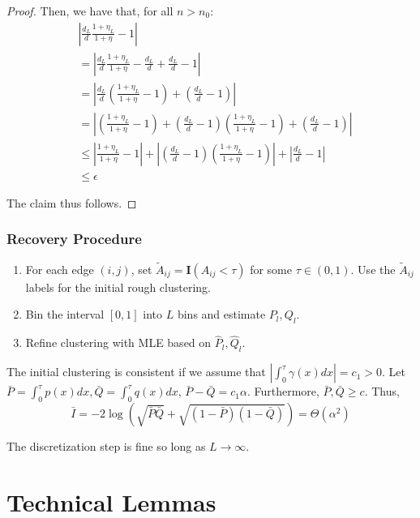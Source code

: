 \documentclass{article}
\begin{document}
\begin{proof}
Then, we have that, for all $n > n_0$:
\begin{align*}
& \left| \frac{d_L}{d} \frac{1+\eta_L}{1+\eta} - 1 \right | \\
&= \left| \frac{d_L}{d} \frac{1 + \eta_L}{1 + \eta} - \frac{d_L}{d} + \frac{d_L}{d} - 1 \right| \\
&= \left| \frac{d_L}{d} \left( \frac{1+\eta_L}{1+\eta} - 1 \right) + \left( \frac{d_L}{d} - 1 \right) \right| \\
&= \left| \left( \frac{1+\eta_L}{1 + \eta} - 1 \right) + \left( \frac{d_L}{d} -1 \right) \left( \frac{1+\eta_L}{1+\eta} - 1 \right) + \left( \frac{d_L}{d} - 1 \right) \right| \\
&\leq  \left| \frac{1+\eta_L}{1 + \eta} - 1 \right| + \left| \left( \frac{d_L}{d} -1 \right) \left( \frac{1+\eta_L}{1+\eta} - 1 \right) \right| + \left| \frac{d_L}{d} - 1  \right| \\
&\leq \epsilon
\end{align*}

The claim thus follows. 

\end{proof}

\subsubsection{Recovery Procedure}

\begin{enumerate}
\item For each edge $(i,j)$, set $\tilde{A}_{ij} = \mathbf{I}(A_{ij} < \tau)$ for some $\tau \in (0, 1)$. Use the $\tilde{A}_{ij}$ labels for the initial rough clustering.
\item Bin the interval $[0,1]$ into $L$ bins and estimate $P_l, Q_l$.
\item Refine clustering with MLE based on $\hat{P}_l, \hat{Q}_l$.
\end{enumerate}


The initial clustering is consistent if we assume that $\left| \int_0^{\tau} \gamma(x) dx \right| = c_1 > 0$. Let $\bar{P} = \int_0^{\tau} p(x) dx, \bar{Q} = \int_0^{\tau} q(x) dx$, $\bar{P} - \bar{Q} = c_1 \alpha$. Furthermore, $\bar{P}, \bar{Q} \geq c$. Thus, 
\[
\bar{I} = -2 \log \left( \sqrt{\bar{P} \bar{Q}} + \sqrt{(1-\bar{P})(1-\bar{Q})} \right) = \Theta( \alpha^2)
\]

The discretization step is fine so long as $L \rightarrow \infty$. 



\newpage
\section{Technical Lemmas}
\end{document}
